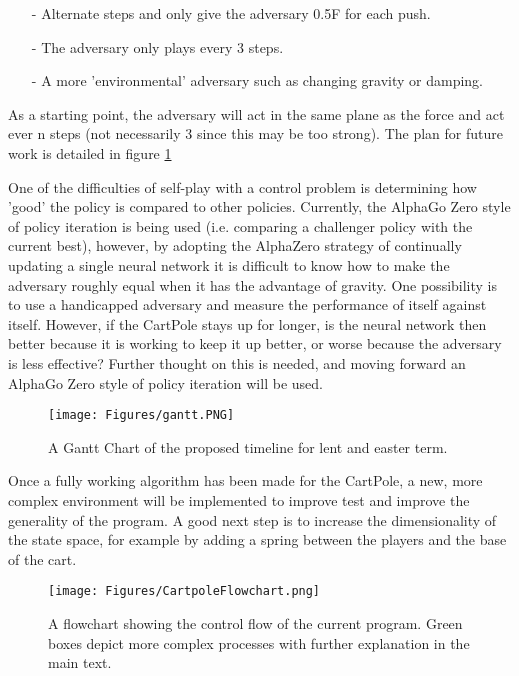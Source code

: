 \documentclass[11.7pt]{article}
\begin{document}
\begin{itemize}
   \item[-] Alternate steps and only give the adversary 0.5F for each push.
   \item[-] The adversary only plays every 3 steps.
   \item[-] A more 'environmental' adversary such as changing gravity or damping.
\end{itemize}

 As a starting point, the adversary will act in the same plane as the force and act ever n steps (not necessarily 3 since this may be too strong). The plan for future work is detailed in figure \ref{fig:gantt}

 One of the difficulties of self-play with a control problem is determining how 'good' the policy is compared to other policies. Currently, the AlphaGo Zero style of policy iteration is being used (i.e. comparing a challenger policy with the current best), however, by adopting the AlphaZero strategy of continually updating a single neural network it is difficult to know how to make the adversary roughly equal when it has the advantage of gravity. One possibility is to use a handicapped adversary and measure the performance of itself against itself. However, if the CartPole stays up for longer, is the neural network then better because it is working to keep it up better, or worse because the adversary is less effective? Further thought on this is needed, and moving forward an AlphaGo Zero style of policy iteration will be used.

\begin{figure}[h]
   \centering
   \texttt{[image: Figures/gantt.PNG]}
   \caption{\label{fig:gantt} A Gantt Chart of the proposed timeline for lent and easter term.}
\end{figure}

Once a fully working algorithm has been made for the CartPole, a new, more complex environment will be implemented to improve test and improve the generality of the program. A good next step is to increase the dimensionality of the state space, for example by adding a spring between the players and the base of the cart.




\begin{figure}[b]
   \centering
   \texttt{[image: Figures/CartpoleFlowchart.png]}
   \caption{\label{fig:flowchart} A flowchart showing the control flow of the current program. Green boxes depict more complex processes with further explanation in the main text.}
\end{figure}
\end{document}
